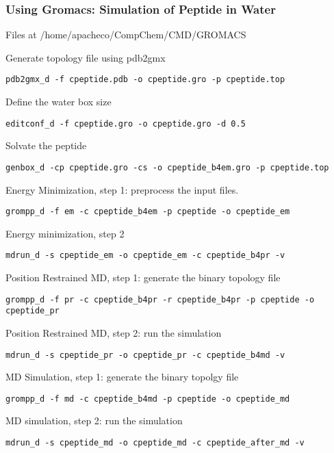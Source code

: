 \documentclass[slidestop,mathserif,compress,xcolor=svgnames]{beamer}
\begin{document}
\begin{frame}
  \frametitle{\small Using Gromacs: Simulation of Peptide in Water}
  \vspace{-0.2cm}
  \begin{block}{\small Files at /home/apacheco/CompChem/CMD/GROMACS}
    \begin{enumerate}
      {\tiny
      \item Generate topology file using pdb2gmx
      \item[] \texttt{{\color{magenta}pdb2gmx\_d} -f {\color{blue}cpeptide.pdb} -o {\color{DarkGreen}cpeptide.gro} -p {\color{DarkGreen}cpeptide.top}}
      \item Define the water box size
      \item[] \texttt{{\color{magenta}editconf\_d} -f {\color{blue}cpeptide.gro} -o {\color{DarkGreen}cpeptide.gro} -d 0.5}
      \item Solvate the peptide
      \item[] \texttt{{\color{magenta}genbox\_d} -cp {\color{blue}cpeptide.gro} -cs -o {\color{DarkGreen}cpeptide\_b4em.gro} -p {\color{DarkGreen}cpeptide.top}}
      \item Energy Minimization, step 1: preprocess the input files.
      \item[] \texttt{{\color{magenta}grompp\_d} -f {\color{red}em} -c {\color{blue}cpeptide\_b4em} -p {\color{blue}cpeptide} -o {\color{DarkGreen}cpeptide\_em}}
      \item Energy minimization, step 2
      \item[] \texttt{{\color{magenta}mdrun\_d} -s {\color{blue}cpeptide\_em} -o {\color{DarkGreen}cpeptide\_em} -c {\color{DarkGreen}cpeptide\_b4pr} -v }
      \item Position Restrained MD, step 1: generate the binary topology file
      \item[] \texttt{{\color{magenta}grompp\_d} -f {\color{blue}pr} -c {\color{blue}cpeptide\_b4pr} -r {\color{blue}cpeptide\_b4pr} -p {\color{blue}cpeptide} -o {\color{DarkGreen}cpeptide\_pr} }
      \item Position Restrained MD, step 2: run the simulation
      \item[] \texttt{{\color{magenta}mdrun\_d} -s {\color{blue}cpeptide\_pr} -o {\color{DarkGreen}cpeptide\_pr} -c {\color{DarkGreen}cpeptide\_b4md} -v}
      \item MD Simulation, step 1: generate the binary topolgy file
      \item[]\texttt{{\color{magenta}grompp\_d} -f {\color{blue}md} -c {\color{blue}cpeptide\_b4md}  -p {\color{blue}cpeptide} -o {\color{DarkGreen}cpeptide\_md} }
      \item MD simulation, step 2: run the simulation
      \item[] \texttt{{\color{magenta}mdrun\_d} -s {\color{blue}cpeptide\_md} -o {\color{blue}cpeptide\_md} -c {\color{DarkGreen}cpeptide\_after\_md} -v }

      }
    \end{enumerate}
  \end{block}
\end{frame}
\end{document}
